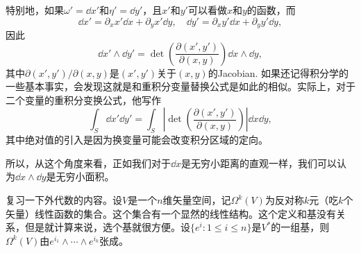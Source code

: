 特别地，如果$\omega'=\dd x'$和$\eta'=\dd y'$，且$x'$和$y'$可以看做$x$和$y$的函数，而
\[
	\dd x'=\partial_x x' \dd x+\partial_y x' \dd y,\quad \dd y'=\partial_x y' \dd x+\partial_y y' \dd y,
\]
因此
\[
	\dd x'\wedge \dd y'=\det\left(\frac{\partial(x',y')}{\partial (x,y)}\right)\dd x\wedge \dd y,
\]
其中$\partial(x',y')/\partial (x,y)$是$(x',y')$关于$(x,y)$的Jacobian. 如果还记得积分学的一些基本事实，会发现这就是和重积分变量替换公式是如此的相似。实际上，对于二个变量的重积分变换公式，他写作
\[
	\int_S\dd x' \dd y'=\int_S\left|\det\left(\frac{\partial(x',y')}{\partial (x,y)}\right)\right|\dd x \dd y,
\]
其中绝对值的引入是因为换变量可能会改变积分区域的定向。

所以，从这个角度来看，正如我们对于$\dd x$是无穷小距离的直观一样，我们可以认为$\dd x\wedge \dd y$是无穷小面积。


\para 复习一下外代数的内容。设$V$是一个$n$维矢量空间，记$\Omega^k(V)$为反对称$k$元（吃$k$个矢量）线性函数的集合。这个集合有一个显然的线性结构。这个定义和基没有关系，但是就计算来说，选个基就很方便。设$\{e^i:1\leq i \leq n\}$是$V^*$的一组基，则$\Omega^k(V)$由$e^{i_1}\wedge \cdots \wedge e^{i_k}$张成。

\section{}
